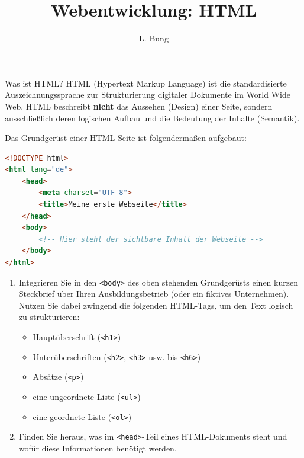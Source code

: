 \documentclass[11pt, a4paper, oneside]{article}
\title{Webentwicklung: HTML}
\author{L. Bung}
\begin{document}
	\maketitle
	
	\begin{hint}{Was ist HTML?}
		HTML (Hypertext Markup Language) ist die standardisierte Auszeichnungssprache zur Strukturierung digitaler Dokumente im World Wide Web.
		HTML beschreibt \textbf{nicht} das Aussehen (Design) einer Seite, sondern ausschließlich deren logischen Aufbau und die Bedeutung der Inhalte (Semantik).
	
		Das Grundgerüst einer HTML-Seite ist folgendermaßen aufgebaut:
		
		\begin{lstlisting}[language=HTML, numbers=none, frame=none]
<!DOCTYPE html>
<html lang="de">
	<head>
		<meta charset="UTF-8">
		<title>Meine erste Webseite</title>
	</head>
	<body>
		<!-- Hier steht der sichtbare Inhalt der Webseite -->
	</body>
</html>
		\end{lstlisting}
	\end{hint}
	
	
	\begin{enumerate}[label=\alph*)]
		\item Integrieren Sie in den \texttt{<body>} des oben stehenden Grundgerüsts einen kurzen Steckbrief über Ihren Ausbildungsbetrieb (oder ein fiktives Unternehmen).
		Nutzen Sie dabei zwingend die folgenden HTML-Tags, um den Text logisch zu strukturieren:
		
		\begin{itemize}
			\item Hauptüberschrift (\texttt{<h1>})
			\item Unterüberschriften (\texttt{<h2>}, \texttt{<h3>} usw. bis \texttt{<h6>})
			\item Absätze (\texttt{<p>})
			\item eine ungeordnete Liste (\texttt{<ul>})
			\item eine geordnete Liste (\texttt{<ol>})
		\end{itemize}
		
		\item Finden Sie heraus, was im \texttt{<head>}-Teil eines HTML-Dokuments steht und wofür diese Informationen benötigt werden.
	\end{enumerate}
	
	\lines[3cm]
	
\end{document}
